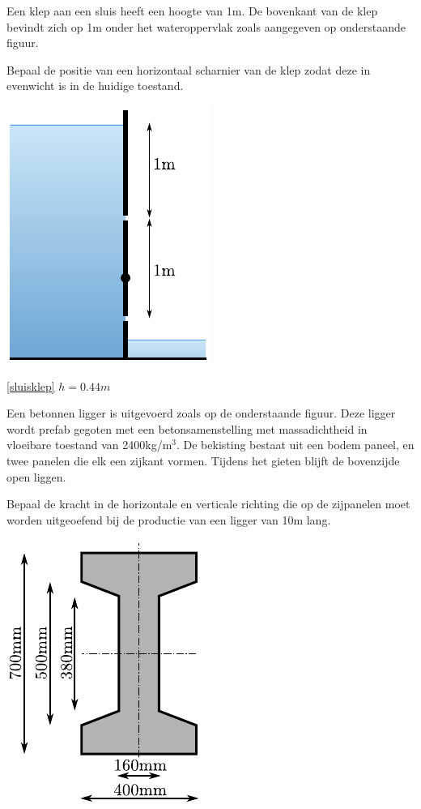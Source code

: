 	\begin{toepassing}[*]
		\label{sluisklep}
Een klep aan een sluis heeft een hoogte van 1m. De bovenkant van de klep bevindt zich op 1m onder het wateroppervlak zoals aangegeven op onderstaande figuur.
		
Bepaal de positie van een horizontaal scharnier van de klep zodat deze in evenwicht is in de huidige toestand.

\centering
\includegraphics{fig/hydrostatica/sluisklep}
	\end{toepassing}
	\begin{antwoord}{\ref{sluisklep}}
		$h = 0.44\unit{m}$
	\end{antwoord}
	\begin{toepassing}[*]
		\label{betonnenligger}
Een betonnen ligger is uitgevoerd zoals op de onderstaande figuur. Deze ligger wordt prefab gegoten met een betonsamenstelling met massadichtheid in vloeibare toestand van 2400kg/m$^3$. De bekisting bestaat uit een bodem paneel, en twee panelen die elk een zijkant vormen. Tijdens het gieten blijft de bovenzijde open liggen.
		
Bepaal de kracht in de horizontale en verticale richting die op de zijpanelen moet worden uitgeoefend bij de productie van een ligger van 10m lang.

\centering
\includegraphics{fig/hydrostatica/betonnenligger}
	\end{toepassing}
